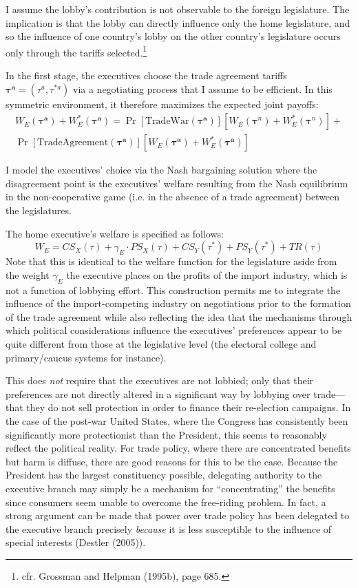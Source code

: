 \documentclass[10pt]{article}
\newcommand{\bta}{\bm{\tau^a}}
\newcommand{\ga}{\gamma}
\begin{document}
I assume the lobby's contribution is not observable to the foreign legislature. The implication is that the lobby can directly influence only the home legislature, and so the influence of one country's lobby on the other country's legislature occurs only through the tariffs selected.\footnote{cfr. Grossman and Helpman (1995b), page 685.}

In the first stage, the executives choose the trade agreement tariffs $\bta=\left(\tau^a,\tau^{*a} \right)$ via a negotiating process that I assume to be efficient. In this symmetric environment, it therefore maximizes the expected joint payoffs:
\begin{multline}
  W_E(\bta) + W_E^*(\bta) = \Pr\left[ \text{TradeWar}(\bta) \right] \left[W_E(\bm{\tau}^{\mathit{n}}) + W_E^*(\bm{\tau}^{\mathit{n}}) \right] + \\ \Pr\left[ \text{TradeAgreement}(\bta) \right] \left[W_E(\bta) + W_E^*(\bta) \right]
  \label{eq:jv}
\end{multline}

I model the executives' choice via the Nash bargaining solution where the disagreement point is the executives' welfare resulting from the Nash equilibrium in the non-cooperative game (i.e. in the absence of a trade agreement) between the legislatures.

The home executive's welfare is specified as follows:
\[
  W_E = \mathit{CS}_X(\tau) + \ga_E \cdot \mathit{PS}_X(\tau) + \mathit{CS}_Y(\tau^*) + \mathit{PS}_Y(\tau^*) + \mathit{TR}(\tau)
\]
Note that this is identical to the welfare function for the legislature aside from the weight $\ga_E$ the executive places on the profits of the import industry, which is not a function of lobbying effort. This construction permits me to integrate the influence of the import-competing industry on negotiations prior to the formation of the trade agreement while also reflecting the idea that the mechanisms through which political considerations influence the executives' preferences appear to be quite different from those at the legislative level (the electoral college and primary/caucus systems for instance).

This does \textit{not} require that the executives are not lobbied; only that their preferences are not directly altered in a significant way by lobbying over trade---that they do not sell protection in order to finance their re-election campaigns. In the case of the post-war United States, where the Congress has consistently been significantly more protectionist than the President, this seems to reasonably reflect the political reality. For trade policy, where there are concentrated benefits but harm is diffuse, there are good reasons for this to be the case. Because the President has the largest constituency possible, delegating authority to the executive branch may simply be a mechanism for ``concentrating'' the benefits since consumers seem unable to overcome the free-riding problem. In fact, a strong argument can be made that power over trade policy has been delegated to the executive branch precisely \textit{because} it is less susceptible to the influence of special interests (Destler (2005)).
\end{document}
